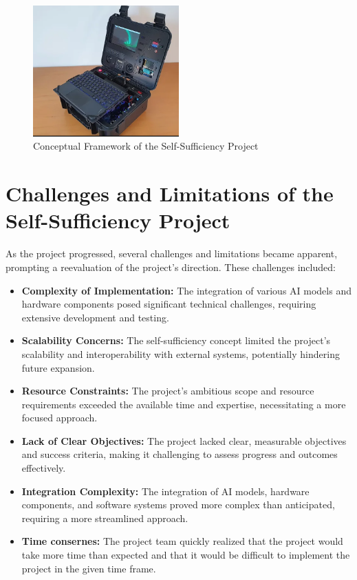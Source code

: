 \begin{figure}[H]
    \centering
    \includegraphics[width=0.5\textwidth]{figures/SAIPIA-concept-picture.png}
    \caption{Conceptual Framework of the Self-Sufficiency Project}
    \label{fig:SelfSufficiencyProject}
\end{figure}


\section{Challenges and Limitations of the Self-Sufficiency Project}

As the project progressed, several challenges and limitations became apparent, prompting a reevaluation of the project's direction. These challenges included:

\begin{itemize}
    \item \textbf{Complexity of Implementation:} The integration of various AI models and hardware components posed significant technical challenges, requiring extensive development and testing.
    \item \textbf{Scalability Concerns:} The self-sufficiency concept limited the project's scalability and interoperability with external systems, potentially hindering future expansion.
    \item \textbf{Resource Constraints:} The project's ambitious scope and resource requirements exceeded the available time and expertise, necessitating a more focused approach.
    \item \textbf{Lack of Clear Objectives:} The project lacked clear, measurable objectives and success criteria, making it challenging to assess progress and outcomes effectively.
    \item \textbf{Integration Complexity:} The integration of AI models, hardware components, and software systems proved more complex than anticipated, requiring a more streamlined approach.
    \item \textbf{Time consernes:} The project team quickly realized that the project would take more time than expected and that it would be difficult to implement the project in the given time frame.
\end{itemize}


